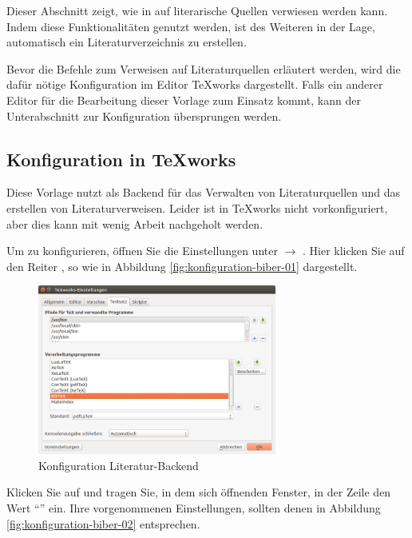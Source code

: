 Dieser Abschnitt zeigt, wie in \latex auf literarische Quellen verwiesen werden kann. Indem diese Funktionalitäten genutzt werden, ist \latex des Weiteren in der Lage, automatisch ein Literaturverzeichnis zu erstellen.

Bevor die Befehle zum Verweisen auf Literaturquellen erläutert werden, wird die dafür nötige Konfiguration im Editor TeXworks dargestellt. Falls ein anderer Editor für die Bearbeitung dieser Vorlage zum Einsatz kommt, kann der Unterabschnitt zur Konfiguration übersprungen werden.


\subsection{Konfiguration in TeXworks}

Diese Vorlage nutzt  als Backend für das Verwalten von Literaturquellen und das erstellen von Literaturverweisen. Leider ist  in TeXworks nicht vorkonfiguriert, aber dies kann mit wenig Arbeit nachgeholt werden.

Um  zu konfigurieren, öffnen Sie die Einstellungen unter  $\rightarrow$ . Hier klicken Sie auf den Reiter , so wie in Abbildung \vref{fig:konfiguration-biber-01} dargestellt.

\begin{figure}
	\centering
	\includegraphics[width=0.7\textwidth]{bilder/konfiguration-biber-01.png}
	\caption{Konfiguration Literatur-Backend}
	\label{fig:konfiguration-biber-01}
\end{figure}

Klicken Sie auf  und tragen Sie, in dem sich öffnenden Fenster, in der Zeile  den Wert \enquote{} ein. Ihre vorgenommenen Einstellungen, sollten denen in Abbildung \vref{fig:konfiguration-biber-02} entsprechen.

